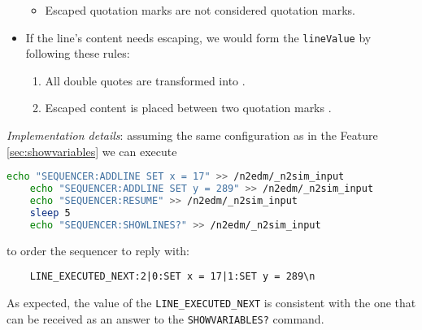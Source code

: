 \begin{itemize}
{\begin{itemize}
			\item Escaped quotation marks  are not considered quotation marks.
		\end{itemize}
	}
	\item{
		If the line's content needs escaping, we would form the \texttt{lineValue} by following these rules:
		\begin{enumerate}
			\item All double quotes  are transformed into .
			\item Escaped content is placed between two quotation marks .
		\end{enumerate}
	}
\end{itemize}

\textit{Implementation details}: assuming the same configuration as in the Feature \ref{sec:showvariables} we can execute

\begin{lstlisting}[language=bash]
	echo "SEQUENCER:ADDLINE SET x = 17" >> /n2edm/_n2sim_input
	echo "SEQUENCER:ADDLINE SET y = 289" >> /n2edm/_n2sim_input
	echo "SEQUENCER:RESUME" >> /n2edm/_n2sim_input
	sleep 5
	echo "SEQUENCER:SHOWLINES?" >> /n2edm/_n2sim_input
\end{lstlisting}

to order the sequencer to reply with:

\begin{verbatim}
	LINE_EXECUTED_NEXT:2|0:SET x = 17|1:SET y = 289\n
\end{verbatim}

As expected, the value of the \texttt{LINE\_EXECUTED\_NEXT} is consistent with the one that can be received as an answer to the \texttt{SHOWVARIABLES?} command.
